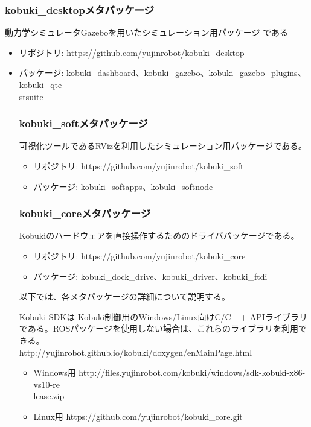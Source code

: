 \subsubsection{kobuki\_desktopメタパッケージ}

動力学シミュレータGazeboを用いたシミュレーション用パッケージ   である

\begin{itemize}
\item リポジトリ: https://github.com/yujinrobot/kobuki\_desktop
\item パッケージ: kobuki\_dashboard、kobuki\_gazebo、kobuki\_gazebo\_plugins、kobuki\_qte\\stsuite


\subsubsection{kobuki\_softメタパッケージ}

可視化ツールであるRVizを利用したシミュレーション用パッケージである。

\begin{itemize}
\item リポジトリ: https://github.com/yujinrobot/kobuki\_soft
\item パッケージ: kobuki\_softapps、kobuki\_softnode
\end{itemize}

\subsubsection{kobuki\_coreメタパッケージ}

Kobukiのハードウェアを直接操作するためのドライバパッケージである。

\begin{itemize}
\item リポジトリ: https://github.com/yujinrobot/kobuki\_core
\item パッケージ: kobuki\_dock\_drive、kobuki\_driver、kobuki\_ftdi
\end{itemize}

以下では、各メタパッケージの詳細について説明する。

\begin{exercise}
  Kobuki SDKは Kobuki制御用のWindows/Linux向けC/C ++ APIライブラリである。ROSパッケージを使用しない場合は、これらのライブラリを利用できる。\\
  http://yujinrobot.github.io/kobuki/doxygen/enMainPage.html

  \begin{itemize}
  \item Windows用
  http://files.yujinrobot.com/kobuki/windows/sdk-kobuki-x86-vs10-re\\lease.zip
  \item Linux用
  https://github.com/yujinrobot/kobuki\_core.git
  \end{itemize}
\end{exercise}


\end{itemize}
